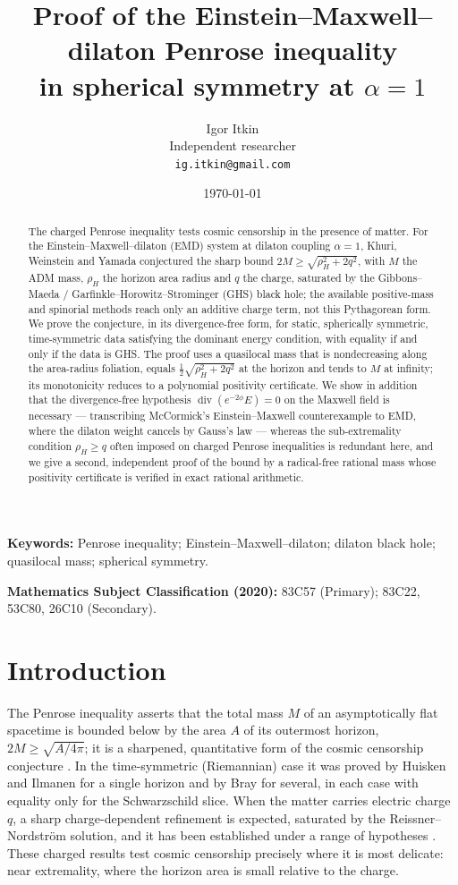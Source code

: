 \documentclass[11pt]{article}
\title{Proof of the Einstein--Maxwell--dilaton Penrose inequality\\ in spherical symmetry at $\alpha=1$}
\author{Igor Itkin\\[2pt] Independent researcher\\ \texttt{ig.itkin@gmail.com}}
\date{\today}
\theoremstyle{plain}
\theoremstyle{definition}
\newcommand{\rH}{\rho_{\!H}}
\begin{document}
\maketitle

\begin{abstract}
The charged Penrose inequality tests cosmic censorship in the presence of matter. For the
Einstein--Maxwell--dilaton (EMD) system at dilaton coupling $\alpha=1$, Khuri, Weinstein and Yamada
\cite{KWYext} conjectured the sharp bound $2M\ge\sqrt{\rH^2+2q^2}$, with $M$ the ADM mass, $\rH$ the horizon
area radius and $q$ the charge, saturated by the Gibbons--Maeda / Garfinkle--Horowitz--Strominger (GHS) black
hole; the available positive-mass and spinorial methods reach only an additive charge term, not this
Pythagorean form. We prove the conjecture, in its divergence-free form, for static, spherically symmetric,
time-symmetric data satisfying the dominant energy condition, with equality if and only if the data is GHS. The proof uses a quasilocal mass that
is nondecreasing along the area-radius foliation, equals $\tfrac12\sqrt{\rH^2+2q^2}$ at the horizon and tends
to $M$ at infinity; its monotonicity reduces to a polynomial positivity certificate. We show in addition that the divergence-free hypothesis $\operatorname{div}(e^{-2\phi}E)=0$ on the
Maxwell field is necessary --- transcribing McCormick's Einstein--Maxwell counterexample \cite{McCormick} to
EMD, where the dilaton weight cancels by Gauss's law --- whereas the sub-extremality condition $\rH\ge q$ often
imposed on charged Penrose inequalities is redundant here, and we give a second, independent proof of the bound
by a radical-free rational mass whose positivity certificate is verified in exact rational arithmetic.
\end{abstract}

\medskip
\noindent\textbf{Keywords:} Penrose inequality; Einstein--Maxwell--dilaton; dilaton black hole; quasilocal mass;
spherical symmetry.

\smallskip\noindent\textbf{Mathematics Subject Classification (2020):}
83C57 (Primary); 83C22, 53C80, 26C10 (Secondary).

\section{Introduction}\label{sec:intro}

The Penrose inequality asserts that the total mass $M$ of an asymptotically flat spacetime is bounded below by
the area $A$ of its outermost horizon, $2M\ge\sqrt{A/4\pi}$; it is a sharpened, quantitative form of the
cosmic censorship conjecture \cite{Penrose69,Penrose}. In the time-symmetric (Riemannian) case it was proved by Huisken
and Ilmanen \cite{HuiskenIlmanen} for a single horizon and by Bray \cite{Bray} for several, in each case with
equality only for the Schwarzschild slice. When the matter carries electric charge $q$, a sharp charge-dependent
refinement is expected, saturated by the Reissner--Nordstr\"om solution, and it has been established under a
range of hypotheses \cite{DisconziKhuri,KWY,McCormick}. These charged results test cosmic censorship precisely
where it is most delicate: near extremality, where the horizon area is small relative to the charge.
\end{document}
